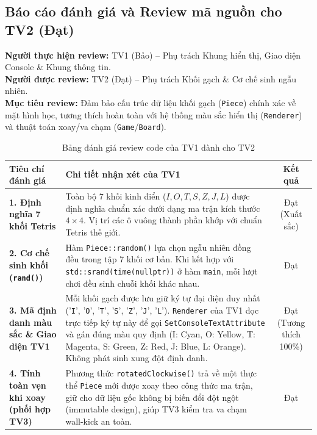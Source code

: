 \subsection{Báo cáo đánh giá và Review mã nguồn cho TV2 (Đạt)}
\label{sec:review-tv2}

\textbf{Người thực hiện review:} TV1 (Bảo) -- Phụ trách Khung hiển thị, Giao diện Console \& Khung thông tin.\\
\textbf{Người được review:} TV2 (Đạt) -- Phụ trách Khối gạch \& Cơ chế sinh ngẫu nhiên.\\
\textbf{Mục tiêu review:} Đảm bảo cấu trúc dữ liệu khối gạch (\texttt{Piece}) chính xác về mặt hình học, tương thích hoàn toàn với hệ thống màu sắc hiển thị (\texttt{Renderer}) và thuật toán xoay/va chạm (\texttt{Game}/\texttt{Board}).

\begin{table}[H]
\centering\small
\begin{tabularx}{\linewidth}{@{}p{3.2cm} X c@{}}
\toprule
\textbf{Tiêu chí đánh giá} & \textbf{Chi tiết nhận xét của TV1} & \textbf{Kết quả}\\
\midrule
\textbf{1. Định nghĩa 7 khối Tetris} &
Toàn bộ 7 khối kinh điển ($I, O, T, S, Z, J, L$) được định nghĩa chuẩn xác dưới dạng ma trận kích thước $4 \times 4$. Vị trí các ô vuông thành phần khớp với chuẩn Tetris thế giới. & Đạt (Xuất sắc)\\

\textbf{2. Cơ chế sinh khối (\texttt{rand()})} &
Hàm \texttt{Piece::random()} lựa chọn ngẫu nhiên đồng đều trong tập 7 khối cơ bản. Khi kết hợp với \texttt{std::srand(time(nullptr))} ở hàm \texttt{main}, mỗi lượt chơi đều sinh chuỗi khối khác nhau. & Đạt\\

\textbf{3. Mã định danh màu sắc \& Giao diện TV1} &
Mỗi khối gạch được lưu giữ ký tự đại diện duy nhất ('\texttt{I}', '\texttt{O}', '\texttt{T}', '\texttt{S}', '\texttt{Z}', '\texttt{J}', '\texttt{L}'). \texttt{Renderer} của TV1 đọc trực tiếp ký tự này để gọi \texttt{SetConsoleTextAttribute} và gán đúng màu quy định (I: Cyan, O: Yellow, T: Magenta, S: Green, Z: Red, J: Blue, L: Orange). Không phát sinh xung đột định danh. & Đạt (Tương thích 100\%)\\

\textbf{4. Tính toàn vẹn khi xoay (phối hợp TV3)} &
Phương thức \texttt{rotatedClockwise()} trả về một thực thể \texttt{Piece} mới được xoay theo công thức ma trận, giữ cho dữ liệu gốc không bị biến đổi đột ngột (immutable design), giúp TV3 kiểm tra va chạm wall-kick an toàn. & Đạt\\
\bottomrule
\end{tabularx}
\caption{Bảng đánh giá review code của TV1 dành cho TV2}
\end{table}

